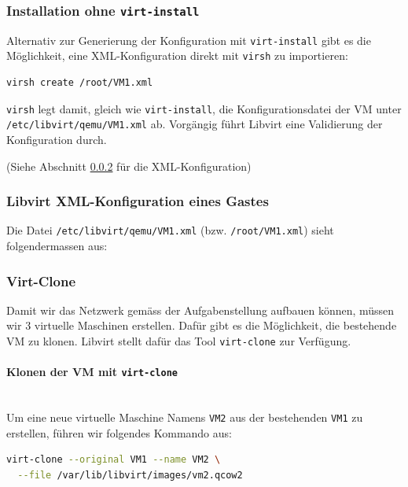 \subsubsection{Installation ohne \lstinline|virt-install|}

Alternativ zur Generierung der Konfiguration mit \lstinline|virt-install| gibt es die Möglichkeit, eine XML-Konfiguration  direkt mit \lstinline|virsh| zu importieren:

\begin{lstlisting}
virsh create /root/VM1.xml
\end{lstlisting}

\lstinline|virsh| legt damit, gleich wie \lstinline|virt-install|, die Konfigurationsdatei der VM unter \lstinline|/etc/libvirt/qemu/VM1.xml| ab. Vorgängig führt Libvirt eine Validierung der Konfiguration durch.

(Siehe Abschnitt \ref{sec:libvirt-xml-konfiguration-eines-gastes} für die XML-Konfiguration)

\subsubsection{Libvirt XML-Konfiguration eines Gastes}\label{sec:libvirt-xml-konfiguration-eines-gastes}

Die Datei \lstinline|/etc/libvirt/qemu/VM1.xml| (bzw. \lstinline|/root/VM1.xml|) sieht folgendermassen aus:


\subsubsection{Virt-Clone}
Damit wir das Netzwerk gemäss der Aufgabenstellung aufbauen können, müssen wir 3 virtuelle Maschinen erstellen. Dafür gibt es die Möglichkeit, die bestehende VM zu klonen. Libvirt stellt dafür das Tool \lstinline|virt-clone| zur Verfügung.

\paragraph{Klonen der VM mit \lstinline|virt-clone|} \hfill \\

Um eine neue virtuelle Maschine Namens \lstinline|VM2| aus der bestehenden \lstinline|VM1| zu erstellen, führen wir folgendes Kommando aus:

\begin{lstlisting}[language=bash]
virt-clone --original VM1 --name VM2 \
  --file /var/lib/libvirt/images/vm2.qcow2
\end{lstlisting}

